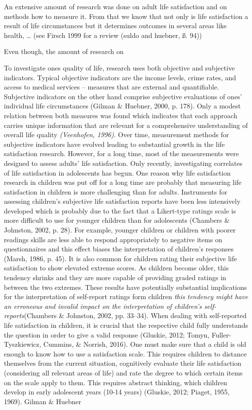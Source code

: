 \documentclass[a4, 12pt]{article}
\begin{document}
\label{sec:measurement}
An extensive amount of research was done on adult life satisfaction and on methods how to measure it. From that we know that not only is life satisfaction a result of life circumstances but it determines outcomes in several areas like health, \ldots{} (see Firsch 1999 for a review (suldo and huebner, ß. 94))

Even though, the amount of research on

To investigate ones quality of life, research uses both objective and subjective indicators. Typical objective indicators are the income levels, crime rates, and access to medical services -- measures that are external and quantifiable. Subjective indicators on the other hand comprise subjective evaluations of ones' individual life circumstances (Gilman \& Huebner, 2000, p. 178). Only a modest relation between both measures was found which indicates that each approach carries unique information that are relevant for a comprehensive understanding of overall life quality \emph{(Veenhofen, 1996)}. Over time, measurement methods for subjective indicators have evolved leading to substantial growth in the life satisfaction research. However, for a long time, most of the measurements were designed to assess adults' life satisfaction. Only recently, investigating correlates of life satisfaction in adolescents has begun. One reason why life satisfaction research in children was put off for a long time are probably that measuring life satisfaction in children is more challenging than for adults. Instruments for assessing children's subjective life satisfaction reports have been less intensively developed which is probably due to the fact that a Likert-type ratings scale is more difficult to use for younger children than for adolescents (Chambers \& Johnston, 2002, p. 28). For example, younger children or children with poorer readings skills are less able to respond appropriately to negative items on questionnaires and this effect biases the interpretation of children's responses (Marsh, 1986, p. 45). It is also common for children rating their subjective life satisfaction to show elevated extreme scores. As children become older, this tendency shrinks and they are more capable of providing graded ratings in between the two extremes. These results have potentially substantial implications for the interpretation of self-report ratings form children \emph{this tendency might have an erroneous and invalid impact on the interpretation of children's self-reports}(Chambers \& Johnston, 2002, pp. 33--34). When dealing with self-reported life satisfaction in children, it is crucial that the respective child fully understands the question in order to give a valid response (Gluskie, 2012; Tomyn, Fuller-Tyszkiewicz, Cummins, \& Norrish, 2016). One must make sure that a child is old enough to know how to use a satisfaction scale. This requires children to distance themselves from the current situation, cognitively evaluate their life satisfaction (considering all relevant areas of life) and rate the degree to which certain items on the scale apply to them. This requires abstract thinking, which children develop in early adolescent years (10-14 years) (Gluskie, 2012; Piaget, 1955, 1969). Gilman \& Huebner 
\end{document}
